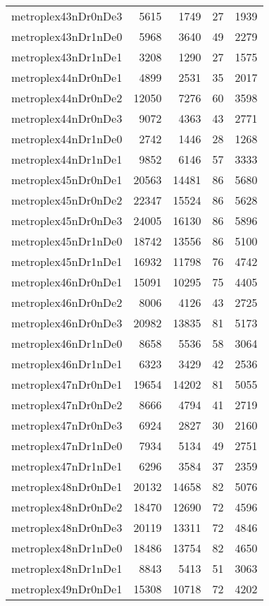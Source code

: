 \begin{tabular}{lrrrr}
metroplex43nDr0nDe3 & 5615 & 1749 & 27 & 1939 \\
metroplex43nDr1nDe0 & 5968 & 3640 & 49 & 2279 \\
metroplex43nDr1nDe1 & 3208 & 1290 & 27 & 1575 \\
metroplex44nDr0nDe1 & 4899 & 2531 & 35 & 2017 \\
metroplex44nDr0nDe2 & 12050 & 7276 & 60 & 3598 \\
metroplex44nDr0nDe3 & 9072 & 4363 & 43 & 2771 \\
metroplex44nDr1nDe0 & 2742 & 1446 & 28 & 1268 \\
metroplex44nDr1nDe1 & 9852 & 6146 & 57 & 3333 \\
metroplex45nDr0nDe1 & 20563 & 14481 & 86 & 5680 \\
metroplex45nDr0nDe2 & 22347 & 15524 & 86 & 5628 \\
metroplex45nDr0nDe3 & 24005 & 16130 & 86 & 5896 \\
metroplex45nDr1nDe0 & 18742 & 13556 & 86 & 5100 \\
metroplex45nDr1nDe1 & 16932 & 11798 & 76 & 4742 \\
metroplex46nDr0nDe1 & 15091 & 10295 & 75 & 4405 \\
metroplex46nDr0nDe2 & 8006 & 4126 & 43 & 2725 \\
metroplex46nDr0nDe3 & 20982 & 13835 & 81 & 5173 \\
metroplex46nDr1nDe0 & 8658 & 5536 & 58 & 3064 \\
metroplex46nDr1nDe1 & 6323 & 3429 & 42 & 2536 \\
metroplex47nDr0nDe1 & 19654 & 14202 & 81 & 5055 \\
metroplex47nDr0nDe2 & 8666 & 4794 & 41 & 2719 \\
metroplex47nDr0nDe3 & 6924 & 2827 & 30 & 2160 \\
metroplex47nDr1nDe0 & 7934 & 5134 & 49 & 2751 \\
metroplex47nDr1nDe1 & 6296 & 3584 & 37 & 2359 \\
metroplex48nDr0nDe1 & 20132 & 14658 & 82 & 5076 \\
metroplex48nDr0nDe2 & 18470 & 12690 & 72 & 4596 \\
metroplex48nDr0nDe3 & 20119 & 13311 & 72 & 4846 \\
metroplex48nDr1nDe0 & 18486 & 13754 & 82 & 4650 \\
metroplex48nDr1nDe1 & 8843 & 5413 & 51 & 3063 \\
metroplex49nDr0nDe1 & 15308 & 10718 & 72 & 4202 \\

\end{tabular}
